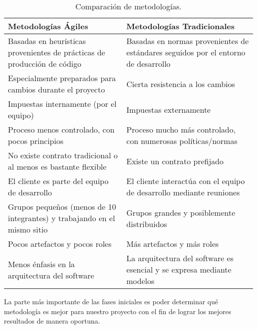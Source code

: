 \begin{table}[h]
    \footnotesize
    \centering
    \setlength\arrayrulewidth{0.8pt}
    \begin{tabular}{| >{\centering\arraybackslash}m{2in} | >{\centering\arraybackslash}m{2in} |}

        \hline
        \rowcolor{RoyalBlue}
        \textbf{Metodologías Ágiles} & \textbf{Metodologías Tradicionales} \\
        \hline
        Basadas en heurísticas provenientes de prácticas de producción de código & Basadas en normas provenientes de estándares seguidos por el entorno de desarrollo \\
        \hline
        Especialmente preparados para cambios durante el proyecto & Cierta resistencia a los cambios \\
        \hline
        Impuestas internamente (por el equipo) & Impuestas externamente \\
        \hline
        Proceso menos controlado, con pocos principios & Proceso mucho más controlado, con numerosas políticas/normas \\
        \hline
        No existe contrato tradicional o al menos es bastante flexible & Existe un contrato prefijado \\
        \hline
        El cliente es parte del equipo de desarrollo & El cliente interactúa con el equipo de desarrollo mediante reuniones \\
        \hline
        Grupos pequeños (menos de 10 integrantes) y trabajando en el mismo sitio & Grupos grandes y posiblemente distribuidos \\
        \hline
        Pocos artefactos y pocos roles & Más artefactos y más roles \\
        \hline
        Menos énfasis en la arquitectura del software & La arquitectura del software es esencial y se expresa mediante modelos \\
        \hline
        
    \end{tabular}

    \caption[Comparación de metodologías]{Comparación de metodologías. \cite{canos2003metodologias}}\label{table:comparacion_metodologias}

\end{table}

La parte más importante de las fases iniciales es poder determinar qué metodología es mejor para nuestro proyecto con el fin de lograr los mejores resultados de manera oportuna.

